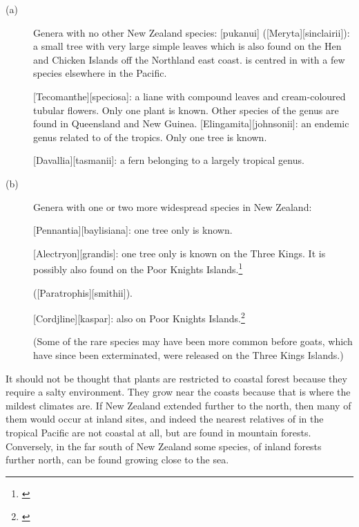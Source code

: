 \begin{description}
\item[{(a)}]Genera with no other New Zealand species: [pukanui] ([Meryta][sinclairii]): a small tree with very large simple leaves which is also found on the Hen and Chicken Islands off the Northland east coast.  is centred in  with a few species elsewhere in the Pacific.

[Tecomanthe][speciosa]: a liane with compound leaves and cream-coloured tubular flowers.
Only one plant is known.
Other species of the genus are found in Queensland and New Guinea. [Elingamita][johnsonii]: an endemic genus related to  of the tropics.
Only one tree is known.

[Davallia][tasmanii]: a fern belonging to a largely tropical genus.
\item[{(b)}]Genera with one or two more widespread species in New Zealand:

[Pennantia][baylisiana]: one tree only is known.

[Alectryon][grandis]: one tree only is known on the Three Kings.
It is possibly also found on the Poor Knights Islands.\footnote{\cite{wright1983conservation}}

 ([Paratrophis][smithii]).

[Cordjline][kaspar]: also on Poor Knights Islands.\footnote{\cite{wright1983conservation}}

(Some of the rare species may have been more common before goats, which have since been exterminated, were released on the Three Kings Islands.)
\end{description}

It should not be thought that plants are restricted to coastal forest because they require a salty environment.
They grow near the coasts because that is where the mildest climates are.
If New Zealand extended further to the north, then many of them would occur at inland sites, and indeed the nearest relatives of  in the tropical Pacific are not coastal at all, but are found in mountain forests.
Conversely, in the far south of New Zealand some species, of inland forests further north, can be found growing close to the sea.

